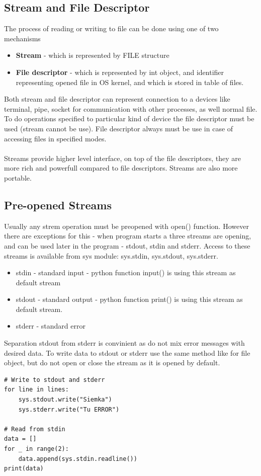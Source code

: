 \documentclass{article}
\begin{document}
\subsection{Stream and File Descriptor}
The process of reading or writing to file can be done using one of two mechanisms
\begin{itemize}
\item \textbf{Stream} - which is represented by FILE structure
\item \textbf{File descriptor} - which is represented by int object, and identifier representing opened file in OS kernel, and which is stored in table of files.
\end{itemize}
Both stream and file descriptor can represent connection to a devices like terminal, pipe, socket for communication with other processes, as well normal file. To do operations specified to particular kind of device the file descriptor must be used (stream cannot be use). File descriptor always must be use in case of accessing files in specified modes.
\paragraph{}
Streams provide higher level interface, on top of the file descriptors, they are more rich and powerfull compared to file descriptors. Streams are also more portable.

\subsection{Pre-opened Streams}
Usually any strem operation must be preopened with open() function. However there are exceptions for this - when program starts a three streams are opening, and can be used later in the program - stdout, stdin and stderr. Access to these streams is available from sys module: sys.stdin, sys.stdout, sys.stderr. 
\begin{itemize}
\item stdin - standard input - python function input() is using this stream as default stream
\item stdout - standard output - python function print() is using this stream as default stream.
\item stderr - standard error
\end{itemize}
Separation stdout from stderr is convinient as do not mix error messages with desired data. To write data to stdout or stderr use the same method like for file object, but do not open or close the stream as it is opened by default.
\begin{lstlisting}[style=pystyle]
# Write to stdout and stderr
for line in lines:
    sys.stdout.write("Siemka")
    sys.stderr.write("Tu ERROR")

# Read from stdin
data = []
for _ in range(2):
    data.append(sys.stdin.readline())
print(data)
\end{lstlisting}
\end{document}

